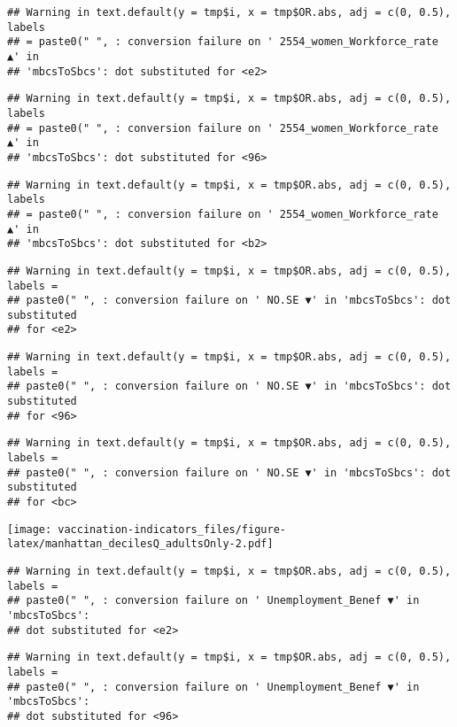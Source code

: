\documentclass[
]{article}
\begin{document}
\begin{verbatim}
## Warning in text.default(y = tmp$i, x = tmp$OR.abs, adj = c(0, 0.5), labels
## = paste0(" ", : conversion failure on ' 2554_women_Workforce_rate ▲' in
## 'mbcsToSbcs': dot substituted for <e2>
\end{verbatim}

\begin{verbatim}
## Warning in text.default(y = tmp$i, x = tmp$OR.abs, adj = c(0, 0.5), labels
## = paste0(" ", : conversion failure on ' 2554_women_Workforce_rate ▲' in
## 'mbcsToSbcs': dot substituted for <96>
\end{verbatim}

\begin{verbatim}
## Warning in text.default(y = tmp$i, x = tmp$OR.abs, adj = c(0, 0.5), labels
## = paste0(" ", : conversion failure on ' 2554_women_Workforce_rate ▲' in
## 'mbcsToSbcs': dot substituted for <b2>
\end{verbatim}

\begin{verbatim}
## Warning in text.default(y = tmp$i, x = tmp$OR.abs, adj = c(0, 0.5), labels =
## paste0(" ", : conversion failure on ' NO.SE ▼' in 'mbcsToSbcs': dot substituted
## for <e2>
\end{verbatim}

\begin{verbatim}
## Warning in text.default(y = tmp$i, x = tmp$OR.abs, adj = c(0, 0.5), labels =
## paste0(" ", : conversion failure on ' NO.SE ▼' in 'mbcsToSbcs': dot substituted
## for <96>
\end{verbatim}

\begin{verbatim}
## Warning in text.default(y = tmp$i, x = tmp$OR.abs, adj = c(0, 0.5), labels =
## paste0(" ", : conversion failure on ' NO.SE ▼' in 'mbcsToSbcs': dot substituted
## for <bc>
\end{verbatim}

\texttt{[image: vaccination-indicators\_files/figure-latex/manhattan\_decilesQ\_adultsOnly-2.pdf]}

\begin{verbatim}
## Warning in text.default(y = tmp$i, x = tmp$OR.abs, adj = c(0, 0.5), labels =
## paste0(" ", : conversion failure on ' Unemployment_Benef ▼' in 'mbcsToSbcs':
## dot substituted for <e2>
\end{verbatim}

\begin{verbatim}
## Warning in text.default(y = tmp$i, x = tmp$OR.abs, adj = c(0, 0.5), labels =
## paste0(" ", : conversion failure on ' Unemployment_Benef ▼' in 'mbcsToSbcs':
## dot substituted for <96>
\end{verbatim}
\end{document}
